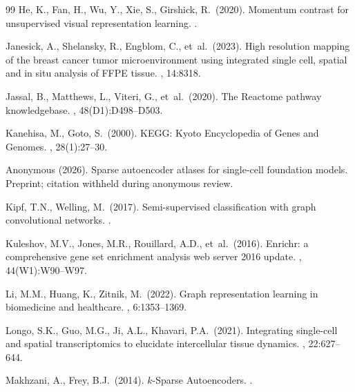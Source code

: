 \documentclass[11pt]{article}
\begin{document}
\begin{thebibliography}{99}
He, K., Fan, H., Wu, Y., Xie, S., Girshick, R.\ (2020).
\newblock Momentum contrast for unsupervised visual representation learning.
.


Janesick, A., Shelansky, R., Engblom, C., et~al.\ (2023).
\newblock High resolution mapping of the breast cancer tumor microenvironment
  using integrated single cell, spatial and in situ analysis of FFPE tissue.
, 14:8318.

Jassal, B., Matthews, L., Viteri, G., et~al.\ (2020).
\newblock The Reactome pathway knowledgebase.
, 48(D1):D498--D503.

Kanehisa, M., Goto, S.\ (2000).
\newblock KEGG: Kyoto Encyclopedia of Genes and Genomes.
, 28(1):27--30.

Anonymous (2026).
\newblock Sparse autoencoder atlases for single-cell foundation models.
\newblock Preprint; citation withheld during anonymous review.

Kipf, T.N., Welling, M.\ (2017).
\newblock Semi-supervised classification with graph convolutional networks.
.

Kuleshov, M.V., Jones, M.R., Rouillard, A.D., et~al.\ (2016).
\newblock Enrichr: a comprehensive gene set enrichment analysis web server
  2016 update.
, 44(W1):W90--W97.

Li, M.M., Huang, K., Zitnik, M.\ (2022).
\newblock Graph representation learning in biomedicine and healthcare.
, 6:1353--1369.

Longo, S.K., Guo, M.G., Ji, A.L., Khavari, P.A.\ (2021).
\newblock Integrating single-cell and spatial transcriptomics to elucidate
  intercellular tissue dynamics.
, 22:627--644.

Makhzani, A., Frey, B.J.\ (2014).
\newblock $k$-Sparse Autoencoders.
.



\end{thebibliography}
\end{document}
